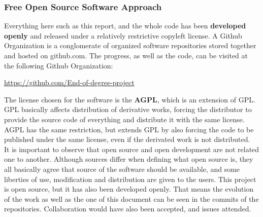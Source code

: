 \subsubsection{Free Open Source Software Approach}
Everything here such as this report, and the whole code has been \textbf{developed openly} and released under a relatively restrictive copyleft license. A Github Organization is a conglomerate of organized software repositories stored together and hosted on github.com. The progress, as well as the code, can be visited at the following Github Organization:
\begin{center}\url{https://github.com/End-of-degree-project}\end{center}
The license chosen for the software is the \textbf{AGPL}, which is an extension of GPL. GPL basically affects distribution of derivative works, forcing the distributor to provide the source code of everything and distribute it with the same license. AGPL has the same restriction, but extends GPL by also forcing the code to be published under the same license, even if the derivated work is not distributed.\\[.2cm]
It is important to observe that open source and open development are not related one to another. Although sources differ when defining what open source is, they all basically agree that source of the software should be available, and some liberties of use, modification and distribution are given to the users. This project is open source, but it has also been developed openly. That means the evolution of the work as well as the one of this document can be seen in the commits of the repositories. Collaboration would have also been accepted, and issues attended.
